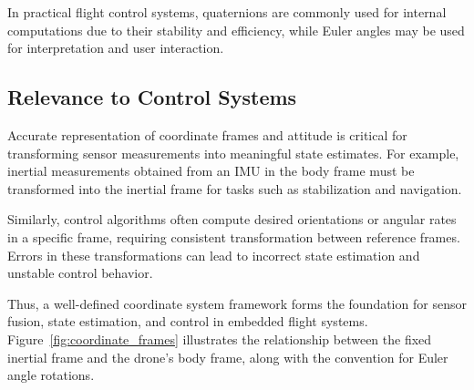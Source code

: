 In practical flight control systems, quaternions are commonly used for internal computations due to their stability and efficiency, while Euler angles may be used for interpretation and user interaction.

\subsection{Relevance to Control Systems}

Accurate representation of coordinate frames and attitude is critical for transforming sensor measurements into meaningful state estimates. For example, inertial measurements obtained from an IMU in the body frame must be transformed into the inertial frame for tasks such as stabilization and navigation.

Similarly, control algorithms often compute desired orientations or angular rates in a specific frame, requiring consistent transformation between reference frames. Errors in these transformations can lead to incorrect state estimation and unstable control behavior.

Thus, a well-defined coordinate system framework forms the foundation for sensor fusion, state estimation, and control in embedded flight systems. Figure~\ref{fig:coordinate_frames} illustrates the relationship between the fixed inertial frame and the drone's body frame, along with the convention for Euler angle rotations.

